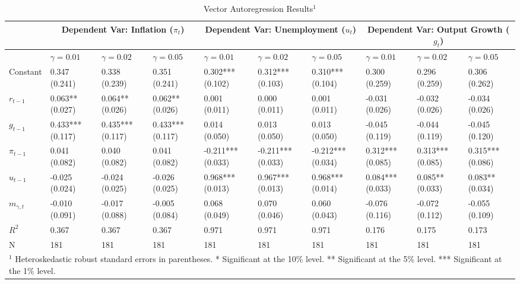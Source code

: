 \documentclass[12pt]{article}
\begin{document}
\begin{sidewaystable}\caption{Vector Autoregression Results$^1$}\label{tb:var}
\begin{center}
\begin{tabular}{l|p{0.71in} p{0.71in} p{0.71in}|p{0.71in} p{0.71in} p{0.71in}|p{0.71in} p{0.71in} p{0.71in}}
 & \multicolumn{3}{c|}{Dependent Var: Inflation ($\pi_t$)} & \multicolumn{3}{c|}{Dependent Var: Unemployment ($u_t$)} &  \multicolumn{3}{c}{Dependent Var: Output Growth ($g_t$)} \\ \hline
 & $\gamma=0.01$ & $\gamma=0.02$ & $\gamma=0.05$ & $\gamma=0.01$ & $\gamma=0.02$ & $\gamma=0.05$& $\gamma=0.01$ & $\gamma=0.02$ & $\gamma=0.05$ \\ \hline
Constant & 0.347 (0.241)    &  0.338 (0.239)    &  0.351 (0.241)     & 0.302*** (0.102)    &  0.312*** (0.103) &    0.310*** (0.104)    & 0.300 (0.259)    &  0.296 (0.259)    &  0.306 (0.262)    \\
$r_{t-1}$ & 0.063** (0.027)    &  0.064** (0.026)    &  0.062** (0.026)     & 0.001 (0.011)    &  0.000 (0.011)    &  0.001 (0.011)     & -0.031 (0.026)    &  -0.032 (0.026)    &  -0.034 (0.026)    \\
$g_{t-1}$ & 0.433*** (0.117)    &  0.435*** (0.117)    &  0.433*** (0.117)    & 0.014 (0.050)    &  0.013 (0.050)    &  0.013 (0.050)     & -0.045 (0.119)    &  -0.044 (0.119)    &  -0.045 (0.120)    \\
$\pi_{t-1}$ & 0.041 (0.082)    &  0.040 (0.082)    &  0.041 (0.082)     & -0.211*** (0.033)    &  -0.211*** (0.033)     &  -0.212*** (0.034)    & 0.312*** (0.085)   &  0.313*** (0.085)   &  0.315*** (0.086)  \\
$u_{t-1}$ & -0.025 (0.024)    &  -0.024 (0.025)    &  -0.026 (0.025)     & 0.968*** (0.013)   &  0.967*** (0.013)   &  0.968*** (0.014)    & 0.084*** (0.033)   &  0.085** (0.033)   &  0.083** (0.034) \\
$m_{\gamma,t}$ & -0.010 (0.091)    &  -0.017 (0.088)    &  -0.005 (0.084)     & 0.068 (0.049)    &  0.070 (0.046)    &  0.060 (0.043)     & -0.076 (0.116)    &  -0.072 (0.112)    &  -0.055 (0.109)    \\ \hline
$R^2$ & 0.367 & 0.367 & 0.367 & 0.971 & 0.971 & 0.971 & 0.176 & 0.175 & 0.173 \\ 
N & 181 & 181 & 181 & 181 & 181 & 181 & 181 & 181 & 181 \\ \hline
\multicolumn{10}{p{8in}}{$^1$ Heteroskedastic robust standard errors in parentheses.\newline
* Significant at the 10\% level.  ** Significant at the 5\% level.  *** Significant at the 1\% level.}\\ 
\end{tabular}
\end{center}
\end{sidewaystable}
\end{document}
